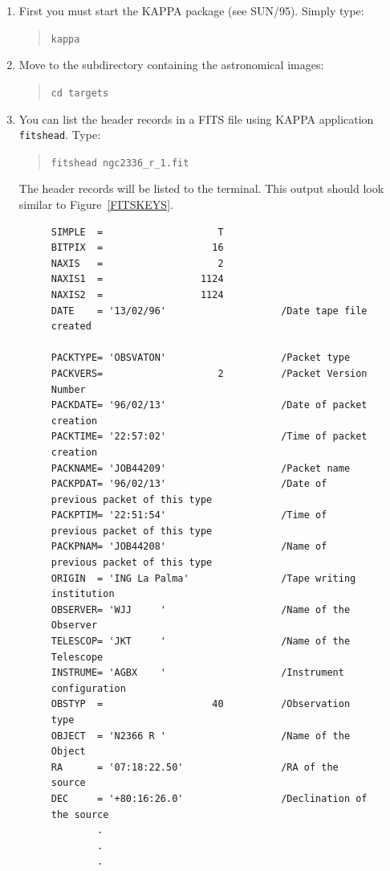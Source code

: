 \documentclass[twoside,11pt]{article}
\newcommand{\xref}[3]{#1}
\begin{document}
\begin{enumerate}

  \item First you must start the KAPPA package (see
   \xref{SUN/95}{sun95}{}\/\cite{SUN95}).  Simply type:

  \begin{quote}
   {\tt kappa}
  \end{quote}

  \item Move to the subdirectory containing the astronomical images:

  \begin{quote}
   {\tt cd targets}
  \end{quote}

  \item You can list the header records in a FITS file using KAPPA
   application \xref{{\tt fitshead}}{sun95}{FITSHEAD}.  Type:

  \begin{quote}
   {\tt fitshead ngc2336\_r\_1.fit}
  \end{quote}

   The header records will be listed to the terminal.  This output should
   look similar to Figure~\ref{FITSKEYS}.

  \begin{figure}[htbp]

\begin{verbatim}
SIMPLE  =                    T
BITPIX  =                   16
NAXIS   =                    2
NAXIS1  =                 1124
NAXIS2  =                 1124
DATE    = '13/02/96'                    /Date tape file created

PACKTYPE= 'OBSVATON'                    /Packet type
PACKVERS=                    2          /Packet Version Number
PACKDATE= '96/02/13'                    /Date of packet creation
PACKTIME= '22:57:02'                    /Time of packet creation
PACKNAME= 'JOB44209'                    /Packet name
PACKPDAT= '96/02/13'                    /Date of previous packet of this type
PACKPTIM= '22:51:54'                    /Time of previous packet of this type
PACKPNAM= 'JOB44208'                    /Name of previous packet of this type
ORIGIN  = 'ING La Palma'                /Tape writing institution
OBSERVER= 'WJJ     '                    /Name of the Observer
TELESCOP= 'JKT     '                    /Name of the Telescope
INSTRUME= 'AGBX    '                    /Instrument configuration
OBSTYP  =                   40          /Observation type
OBJECT  = 'N2366 R '                    /Name of the Object
RA      = '07:18:22.50'                 /RA of the source
DEC     = '+80:16:26.0'                 /Declination of the source
        .
        .
        .
\end{verbatim}


\end{figure}
\end{enumerate}
\end{document}
